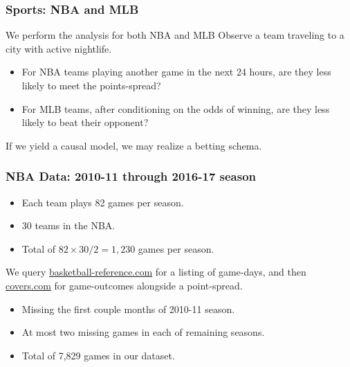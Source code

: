 \documentclass{beamer}
\begin{document}
\begin{frame}   \frametitle{Sports: NBA and MLB}
  \begin{block}{We perform the analysis for both NBA and MLB}     
    Observe a team traveling to a city with active nightlife.
    \vspace{12pt}
    \begin{itemize}       \item For NBA teams playing another game in the next 24 hours, are they less likely to meet the points-spread?
      \item For MLB teams, after conditioning on the odds of winning, are they less likely to beat their opponent?     \end{itemize}
    \vspace{12pt}\begin{block}{If we yield a causal model, we may realize a betting schema.}     \end{block}
  \end{block} 
\end{frame}

\begin{frame}   \frametitle{NBA Data: 2010-11 through 2016-17 season}
  \begin{itemize}     \item Each team plays 82 games per season.
    \item 30 teams in the NBA.
    \item Total of $82 \times 30 / 2 = 1,230$ games per season.  
  \end{itemize}

  \vspace{12pt}We query \href{http://www.basketball-reference.com/leagues/}{basketball-reference.com}
  for a listing of game-days, and then 
  \href{http://www.covers.com/sports/NBA/matchups?selectedDate=2011-1-01}{covers.com} for 
  game-outcomes alongside a point-spread.

  \vspace{12pt}  
  \begin{itemize}     \item Missing the first couple months of 2010-11 season.
    \item At most two missing games in each of remaining seasons.
    \item Total of 7,829 games in our dataset.   \end{itemize}
\end{frame}
\end{document}
